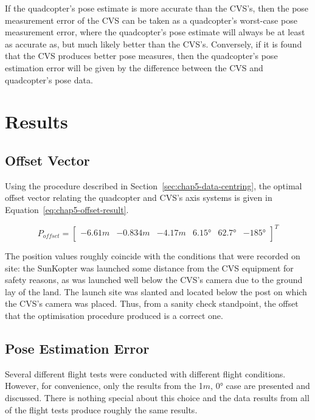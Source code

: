 If the quadcopter's pose estimate is more accurate than the CVS's, then the pose measurement error of the CVS can be taken as a quadcopter's worst-case pose measurement error, where the quadcopter's pose estimate will always be at least as accurate as, but much likely better than the CVS's. Conversely, if it is found that the CVS produces better pose measures, then the quadcopter's pose estimation error will be given by the difference between the CVS and quadcopter's pose data. 

\section{Results}

\subsection{Offset Vector}

Using the procedure described in Section~\ref{sec:chap5-data-centring}, the optimal offset vector relating the quadcopter and CVS's axis systems is given in Equation~\ref{eq:chap5-offset-result}. 

\begin{equation}
  \label{eq:chap5-offset-result}
  P_{offset} = 
  \begin{bmatrix}
    -6.61m & -0.834m & -4.17m & \ang{6.15} & \ang{62.7} & \ang{-185} \\
  \end{bmatrix}^T
\end{equation}

The position values roughly coincide with the conditions that were recorded on site: the SunKopter was launched some distance from the CVS equipment for safety reasons, as was launched well below the CVS's camera due to the ground lay of the land. The launch site was slanted and located below the post on which the CVS's camera was placed. Thus, from a sanity check standpoint, the offset that the optimisation procedure produced is a correct one. 

\subsection{Pose Estimation Error}

Several different flight tests were conducted with different flight conditions. However, for convenience, only the results from the 1$m$, $\ang{0}$ case are presented and discussed. There is nothing special about this choice and the data results from all of the flight tests produce roughly the same results.  

